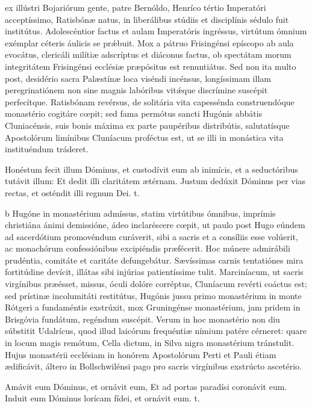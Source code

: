 \documentclass[fontsize=9pt,paper=A6,twoside,BCOR=1mm,DIV=22,headinclude]{scrarticle}
\begin{document}
\begin{multicols}{2}
 ex illústri Bojariórum gente, patre Bernóldo, Henríco tértio Imperatóri acceptíssimo, Ratisbónæ natus, in liberálibus stúdiis et disciplínis sédulo fuit institútus. Adolescéntior factus et aulam Imperatóris ingréssus, virtútum ómnium exémplar céteris áulicis se pr\'æbuit. Mox a pátruo Frisingénsi epíscopo ab aula evocátus, clericáli milítiæ adscríptus et diáconus factus, ob spectátam morum integritátem Frisingénsi ecclésiæ præpósitus est renuntiátus. Sed non ita multo post, desidério sacra Palæstínæ loca viséndi incénsus, longíssimam illam peregrinatiónem non sine magnis labóribus vit\'æque discrímine suscépit perfecítque. Ratisbónam revérsus, de solitária vita capessénda construendóque monastério cogitáre cœpit; sed fama permótus sancti Hugónis abbátis Cluniacénsis, suis bonis máxima ex parte paupéribus distribútis, salutatísque Apostolórum limínibus Cluníacum proféctus est, ut se illi in monástica vita instituéndum tráderet.

\R Honéstum fecit illum Dóminus, et custodívit eum ab inimícis, et a seductóribus tutávit illum: \red{*} Et dedit illi claritátem ætérnam.
\V Justum dedúxit Dóminus per vias rectas, et osténdit illi regnum Dei. t.


b Hugóne in monastérium admíssus, statim virtútibus ómnibus, imprímis christiána ánimi demissióne, ádeo inclaréscere cœpit, ut paulo post Hugo eúndem ad sacerdótium promovéndum curáverit, sibi a sacris et a consíliis esse volúerit, ac monachórum confessiónibus excipiéndis præfécerit. Hoc múnere admirábili prudéntia, comitáte et caritáte defungebátur. Sævíssimas carnis tentatiónes mira fortitúdine devícit, illátas sibi injúrias patientíssime tulit. Marciníacum, ut sacris virgínibus præésset, missus, óculi dolóre corréptus, Cluníacum revérti coáctus est; sed prístinæ incolumitáti restitútus, Hugónis jussu primo monastérium in monte Rótgeri a fundaméntis exstrúxit, mox Gruningénse monastérium, jam pridem in Brisgóvia fundátum, regéndum suscépit. Verum in hoc monastério non diu súbstitit Udalrícus, quod illud laicórum frequéntiæ nímium patére cérneret: quare in locum magis remótum, Cella dictum, in Silva nigra monastérium tránstulit. Hujus monastérii ecclésiam in honórem Apostolórum Perti et Pauli étiam ædificávit, áltero in Bollschwilénsi pago pro sacris virgínibus exstrúcto ascetério.

\R Amávit eum Dóminus, et ornávit eum, \red{*} Et ad portas paradísi coronávit eum.
\V Induit eum Dóminus lorícam fídei, et ornávit eum. t.


\end{multicols}
\end{document}
